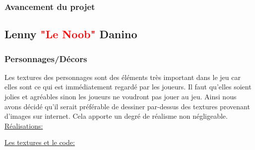 \documentclass{article}
\begin{document}
\subsubsection{Avancement du projet}

\newpage

\subsection{Lenny \textcolor{red}{"Le Noob"} Danino}
\subsubsection{Personnages/Décors}

\par
Les textures des personnages sont des éléments très important dans le jeu car elles sont ce qui est immédiatement regardé par les joueurs. Il faut qu’elles soient jolies et agréables sinon les joueurs ne voudront pas jouer au jeu. Ainsi nous avons décidé qu’il serait préférable de dessiner par-dessus des textures provenant d’images sur internet. Cela apporte un degré de réalisme non négligeable.
\newline
\newline
\underline{Réalisations:}

\par
\underline{Les textures et le code:}
\newline
\end{document}
